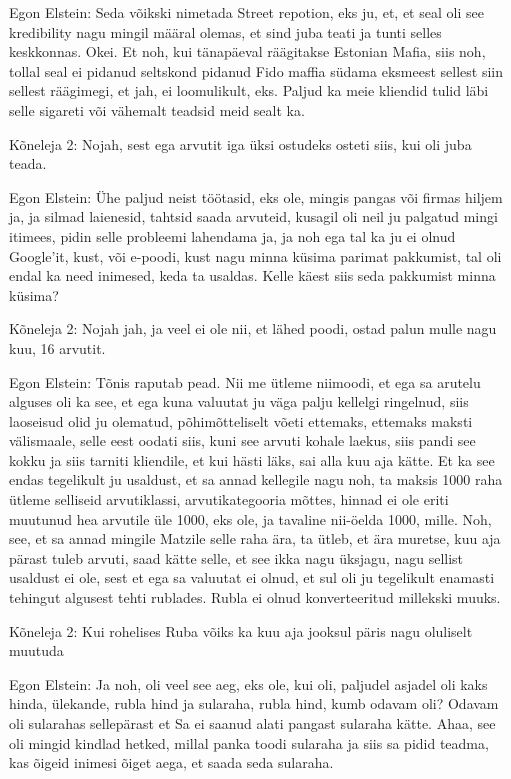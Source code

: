 Egon Elstein:
Seda võikski nimetada Street repotion, eks ju, et, et seal oli see kredibility nagu mingil määral olemas, et sind juba teati ja tunti selles keskkonnas. Okei. Et noh, kui tänapäeval räägitakse Estonian Mafia, siis noh, tollal seal ei pidanud seltskond pidanud Fido maffia südama eksmeest sellest siin sellest räägimegi, et jah, ei loomulikult, eks.
Paljud ka meie kliendid tulid läbi selle sigareti või vähemalt teadsid meid sealt ka.
                 
Kõneleja 2:
Nojah, sest ega arvutit iga üksi ostudeks osteti siis, kui oli juba teada.
                 
Egon Elstein:
Ühe paljud neist töötasid, eks ole, mingis pangas või firmas hiljem ja, ja silmad laienesid, tahtsid saada arvuteid, kusagil oli neil ju palgatud mingi itimees, pidin selle probleemi lahendama ja, ja noh ega tal ka ju ei olnud Google'it, kust, või e-poodi, kust nagu minna küsima parimat pakkumist, tal oli endal ka need inimesed, keda ta usaldas. Kelle käest siis seda pakkumist minna küsima?
                 
Kõneleja 2:
Nojah jah, ja veel ei ole nii, et lähed poodi, ostad palun mulle nagu kuu, 16 arvutit.
                 
Egon Elstein:
Tõnis raputab pead. Nii me ütleme niimoodi, et ega sa arutelu alguses oli ka see, et ega kuna valuutat ju väga palju kellelgi ringelnud, siis laoseisud olid ju olematud, põhimõtteliselt võeti ettemaks, ettemaks maksti välismaale, selle eest oodati siis, kuni see arvuti kohale laekus, siis pandi see kokku ja siis tarniti kliendile, et kui hästi läks, sai alla kuu aja kätte. Et ka see endas tegelikult ju usaldust, et sa annad kellegile nagu noh, ta maksis 1000 raha ütleme selliseid arvutiklassi, arvutikategooria mõttes, hinnad ei ole eriti muutunud hea arvutile üle 1000, eks ole, ja tavaline nii-öelda 1000, mille.
Noh, see, et sa annad mingile Matzile selle raha ära, ta ütleb, et ära muretse, kuu aja pärast tuleb arvuti, saad kätte selle, et see ikka nagu üksjagu, nagu sellist usaldust ei ole, sest et ega sa valuutat ei olnud, et sul oli ju tegelikult enamasti tehingut algusest tehti rublades.
Rubla ei olnud konverteeritud millekski muuks.
                 
Kõneleja 2:
Kui rohelises Ruba võiks ka kuu aja jooksul päris nagu oluliselt muutuda
                 
Egon Elstein:
Ja noh, oli veel see aeg, eks ole, kui oli, paljudel asjadel oli kaks hinda, ülekande, rubla hind ja sularaha, rubla hind, kumb odavam oli? Odavam oli sularahas sellepärast et Sa ei saanud alati pangast sularaha kätte. Ahaa, see oli mingid kindlad hetked, millal panka toodi sularaha ja siis sa pidid teadma, kas õigeid inimesi õiget aega, et saada seda sularaha.
                 
